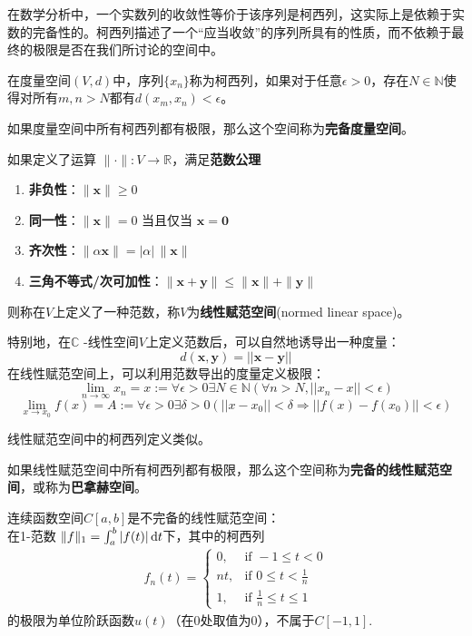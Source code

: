 在数学分析中，一个实数列的收敛性等价于该序列是柯西列，这实际上是依赖于实数的完备性的。柯西列描述了一个“应当收敛”的序列所具有的性质，而不依赖于最终的极限是否在我们所讨论的空间中。
\begin{definition}[柯西列]
    在度量空间$(V,d)$中，序列$\{x_n\}$称为柯西列，如果对于任意$\epsilon>0$，存在$N\in\mathbb{N}$使得对所有$m,n>N$都有$d(x_m,x_n)<\epsilon$。
\end{definition}

\begin{definition}[完备度量空间]
    如果度量空间中所有柯西列都有极限，那么这个空间称为\textbf{完备度量空间}。
\end{definition}

\begin{definition}[范数]
    如果定义了运算
$\|\cdot \| :V\rightarrow \mathbb{R} $，满足\textbf{范数公理}
\begin{enumerate}
    \item \textbf{非负性}：$\|\mathbf{x}\| \geq 0$
    \item \textbf{同一性}：$\|\mathbf{x}\| = 0$ 当且仅当 $\mathbf{x} = \mathbf{0}$
    \item \textbf{齐次性}：$\|\alpha \mathbf{x}\| = |\alpha| \, \|\mathbf{x}\|$
    \item \textbf{三角不等式/次可加性}：$\|\mathbf{x} + \mathbf{y}\| \leq \|\mathbf{x}\| + \|\mathbf{y}\|$
\end{enumerate}
则称在$V$上定义了一种范数，称$V$为\textbf{线性赋范空间}(normed linear space)。
\end{definition}
特别地，在$\mathbb{C}$ -线性空间$V$上定义范数后，可以自然地诱导出一种度量：
$$d(\mathbf x,\mathbf y)=||\mathbf x-\mathbf y||$$
在线性赋范空间上，可以利用范数导出的度量定义极限：
\[\lim_{n\to\infty}x_n=x:=\forall \epsilon>0\exists N\in\mathbb{N}(\forall n>N,||x_n-x||<\epsilon)\]
\[\lim_{x \to x_0} f(x)=A:=\forall \epsilon>0\exists \delta>0(||x-x_0||<\delta\Rightarrow ||f(x)-f(x_0)||<\epsilon) \]

线性赋范空间中的柯西列定义类似。

\begin{definition}[完备的线性赋范空间]
    如果线性赋范空间中所有柯西列都有极限，那么这个空间称为\textbf{完备的线性赋范空间}，或称为\textbf{巴拿赫空间}\cite{real_analysis}。
\end{definition}

\begin{example}
    连续函数空间$C[a,b]$是不完备的线性赋范空间：\\
    在1-范数
$\|f\|_1 =\int_{a}^{b}|f(t)|\,\text dt$下，其中的柯西列\begin{align*}
    f_n(t)=\begin{cases}
        0,&\text{if }-1\leq t <0\\
        nt,&\text{if }0\leq t <\frac{1}{n}\\
        1,&\text{if }\frac{1}{n}\leq t \leq 1
    \end{cases}
\end{align*}
的极限为单位阶跃函数$u(t)$（在0处取值为0），不属于$C[-1,1]$.
\end{example}

